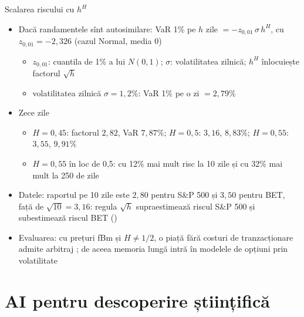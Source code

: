 \begin{frame}{Scalarea riscului cu $h^H$}
\itemsize{\footnotesize}
\begin{itemize}
    \item Dacă randamentele sînt autosimilare: VaR 1\% pe $h$ zile $= -z_{0{,}01}\,\sigma\,h^H$, cu $z_{0{,}01} = -2{,}326$ (cazul Normal, media 0)
    \begin{itemize}
        \item $z_{0{,}01}$: cuantila de 1\% a lui $N(0,1)$; $\sigma$: volatilitatea zilnică; $h^H$ înlocuiește factorul $\sqrt{h}$
        \item volatilitatea zilnică $\sigma = 1{,}2\%$: VaR 1\% pe o zi $= 2{,}79\%$
    \end{itemize}
    \item Zece zile
    \begin{itemize}
        \item $H = 0{,}45$: factorul $2{,}82$, VaR $7{,}87\%$; $H = 0{,}5$: $3{,}16$, $8{,}83\%$; $H = 0{,}55$: $3{,}55$, $9{,}91\%$
        \item $H = 0{,}55$ în loc de 0,5: cu 12\% mai mult risc la 10 zile și cu 32\% mai mult la 250 de zile
    \end{itemize}
    \item Datele: raportul pe 10 zile este $2{,}80$ pentru S\&P 500 și $3{,}50$ pentru BET, față de $\sqrt{10} = 3{,}16$: regula $\sqrt{h}$ supraestimează riscul S\&P 500 și subestimează riscul BET ()
    \item Evaluarea: cu prețuri fBm și $H \neq 1/2$, o piață fără costuri de tranzacționare admite arbitraj ; de aceea memoria lungă intră în modelele de opțiuni prin volatilitate
\end{itemize}
\end{frame}


\section{AI pentru descoperire științifică}

